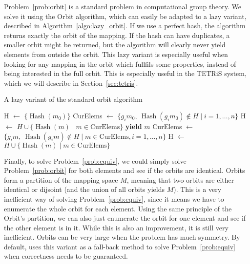 Problem~\ref{prob:orbit} is a standard problem in computational group theory.
We solve it using the Orbit algorithm, which can easily be adapted to a lazy variant, described in Algorithm~\ref{algo:lazy_orbit}.
If we use a perfect hash, the algorithm returns exactly the orbit of the mapping.
If the hash can have duplicates, a smaller orbit might be returned, but the algorithm will clearly never yield elements from outside the orbit.
This lazy variant is especially useful when looking for any mapping in the orbit which fullfils some properties, instead of being interested in the full orbit.
This is especially useful in the \acs*{TETRiS} system, which we will describe in Section~\ref{sec:tetris}.

\begin{algorithm}
	\caption{A lazy variant of the standard orbit algorithm}
	\label{algo:lazy_orbit}
	\begin{algorithmic}[1]
     \State H $\leftarrow$ $\{ \operatorname{Hash}(m_0) \}$
     \State CurElems $\leftarrow$ $\{ g_i m_0,~\operatorname{Hash}(g_i m_0) \notin H \mid i = 1,\ldots,n \}$
     \State H $\leftarrow$ $H \cup \{ \operatorname{Hash}(m) \mid m \in \text{CurElems} \}$
		         \State \textbf{yield }$m$
	     \EndFor 
     \State CurElems $\leftarrow$ $\{ g_i m,~\operatorname{Hash}(g_i m) \notin H \mid m \in \text{CurElems}, i = 1,\ldots,n \}$
     \State H $\leftarrow$ $H \cup \{ \operatorname{Hash}(m) \mid m \in \text{CurElems} \}$
   \EndWhile
	\end{algorithmic}
\end{algorithm}

Finally, to solve Problem~\ref{prob:equiv}, we could simply solve Problem~\ref{prob:orbit} for both elements and see if the orbits are identical.
Orbits form a partition of the mapping space $M$, meaning that two orbits are either identical or dijsoint (and the union of all orbits yields $M$).
This is a very inefficient way of solving Problem~\ref{prob:equiv}, since it means we have to enumerate the whole orbit for each element.
Using the same principle of the Orbit's partition, we can also just enumerate the orbit for one element and see if the other element is in it.
While this is also an improvement, it is still very inefficient. Orbits can be very large when the problem has much symmetry.
By default, \mpsym uses this variant as a fall-back method to solve Problem~\ref{prob:equiv} when correctness needs to be guaranteed.

